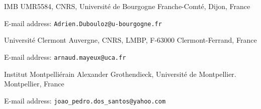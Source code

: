 \documentclass[10pt]{alggeom}
\theoremstyle{definition}
\numberwithin{equation}{section}
\begin{document}
\bigbreak\bigbreak
\noindent \par

\noindent 
\noindent IMB UMR5584, CNRS, Université de Bourgogne Franche-Comté, Dijon, France \par
\noindent E-mail address: \texttt{Adrien.Dubouloz@u-bourgogne.fr}
\noindent  

\medskip

\noindent 
\noindent Universit\'e Clermont Auvergne, CNRS, LMBP, F-63000 Clermont-Ferrand, France \par
\noindent E-mail address: \texttt{arnaud.mayeux@uca.fr}


\medskip

\noindent 
\noindent Institut Montpelliérain Alexander Grothendieck, Université de Montpellier. Montpellier, France \par
\noindent E-mail address: \texttt{joao\_pedro.dos\_santos@yahoo.com}
\end{document}

